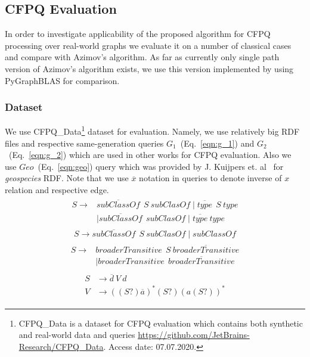 \subsection{CFPQ Evaluation}

In order to investigate applicability of the proposed algorithm for CFPQ processing over real-world graphs we evaluate it on a number of classical cases and compare with Azimov's algorithm.
As far as currently only single path version of Azimov's algorithm exists, we use this version implemented by using PyGraphBLAS for comparison.

\subsubsection{Dataset}

We use CFPQ\_Data\footnote{CFPQ\_Data is a dataset for CFPQ evaluation which contains both synthetic and real-world data and queries \url{https://github.com/JetBrains-Research/CFPQ\_Data}. Access date: 07.07.2020.} dataset for evaluation.
Namely, we use relatively big RDF files and respective same-generation queries $G_1$~(Eq.~\ref{eqn:g_1}) and $G_2$~(Eq.~\ref{eqn:g_2}) which are used in other works for CFPQ evaluation. 
Also we use $Geo$~(Eq.~\ref{eqn:geo}) query which was provided by J. Kuijpers et. al~\cite{Kuijpers:2019:ESC:3335783.3335791} for \textit{geospecies} RDF.
Note that we use $\overline{x}$ notation in queries to denote inverse of $x$ relation and respective edge.
\begin{align}
\begin{split}
\label{eqn:g_1}
S \to & \overline{\textit{subClassOf}} \ \ S \ \textit{subClasOf} \mid \overline{\textit{type}} \ \ S \ \textit{type}\\   & \mid \overline{\textit{subClassOf}} \ \ \textit{subClasOf} \mid \overline{\textit{type}} \ \textit{type}
\end{split}
\end{align}
\begin{align}
\label{eqn:g_2}
S \to \overline{\textit{subClassOf}} \ \ S \ \textit{subClasOf} \mid \textit{subClassOf}
\end{align}
\begin{align}
\begin{split}
\label{eqn:geo}
S \to & \textit{broaderTransitive} \ \  S \ \overline{\textit{broaderTransitive}} \\
      & \mid \textit{broaderTransitive} \ \  \overline{\textit{broaderTransitive}}
\end{split}
\end{align}
\begin{align}
\begin{split}
\label{eqn:ma}
S & \to \overline{d} \ V \ d \\
V & \to ((S?) \overline{a})^* (S?) (a (S?))^*
\end{split}
\end{align}

